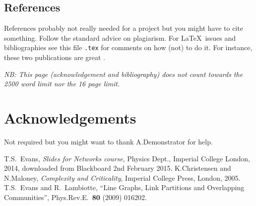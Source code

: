 \documentclass[a4paper,12pt]{article}
\begin{document}
\subsection{References}

References probably not really needed for a project but you might have to cite something.  Follow the standard advice on plagiarism.  For \LaTeX\ issues and bibliographies see this file \texttt{{\jobname}.tex} for comments on how (not) to do it. For instance, these two publications are great \cite{KN05,EL09}.

\newpage
\noindent
\emph{NB: This page (acknowledgement and bibliography) does not count towards the 2500 word limit nor the 16 page limit.}
\vspace*{2cm}

\section*{Acknowledgements}

Not required but you might want to thank A.Demonstrator for help.

%
%

\begin{thebibliography}{99}
  T.S.\ Evans, \emph{Slides for Networks course}, Physics Dept., Imperial College London, 2014, downloaded from Blackboard 2nd February 2015.
  K.Christensen and N.Maloney,
  \emph{Complexity and Criticality},
  Imperial College Press, London, 2005.
  T.S.\ Evans and R.\ Lambiotte,
  ``Line Graphs, Link Partitions and Overlapping Communities'',
  Phys.Rev.E.\ \textbf{80} (2009) 016202.
\end{thebibliography}
\end{document}
